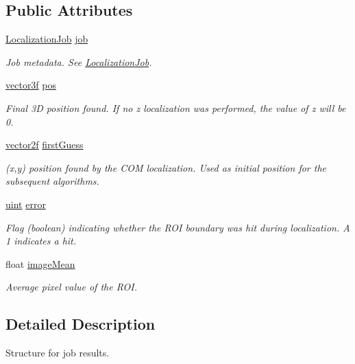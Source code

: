 \subsection*{Public Attributes}
\begin{DoxyCompactItemize}
\item 
\hyperlink{struct_localization_job}{Localization\+Job} \hyperlink{struct_localization_result_a9a6b25c5cc92fe13bae3d0a5d37360f3}{job}
\begin{DoxyCompactList}\small\item\em Job metadata. See \hyperlink{struct_localization_job}{Localization\+Job}. \end{DoxyCompactList}\item 
\hyperlink{std__incl_8h_a2feaef1d85a74bd5cf80df91b1a9a914}{vector3f} \hyperlink{struct_localization_result_a546f66485662c35bc75121513b6d1a60}{pos}
\begin{DoxyCompactList}\small\item\em Final 3D position found. If no z localization was performed, the value of z will be 0. \end{DoxyCompactList}\item 
\hyperlink{std__incl_8h_aba974726076ec2d63a67114c536d123e}{vector2f} \hyperlink{struct_localization_result_a44c7351e9eb9410375c10fcf4e0f0cf9}{first\+Guess}
\begin{DoxyCompactList}\small\item\em (x,y) position found by the C\+OM localization. Used as initial position for the subsequent algorithms. \end{DoxyCompactList}\item 
\hyperlink{std__incl_8h_a91ad9478d81a7aaf2593e8d9c3d06a14}{uint} \hyperlink{struct_localization_result_a90d35a4643bd537d8f763ee8c7749820}{error}
\begin{DoxyCompactList}\small\item\em Flag (boolean) indicating whether the R\+OI boundary was hit during localization. A 1 indicates a hit. \end{DoxyCompactList}\item 
float \hyperlink{struct_localization_result_aba2a42711bc890c8620419f7dc906db9}{image\+Mean}
\begin{DoxyCompactList}\small\item\em Average pixel value of the R\+OI. \end{DoxyCompactList}\end{DoxyCompactItemize}


\subsection{Detailed Description}
Structure for job results. 

